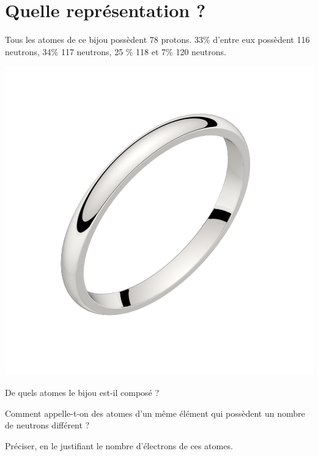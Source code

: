 \section{Quelle représentation ?}

\begin{multicols}{2}
	Tous les atomes de ce bijou possèdent 78 protons. 33\% d'entre eux possèdent 116 neutrons, 34\% 117 neutrons, 25 \% 118 et 7\% 120 neutrons.

	
	\begin{center}
		\includegraphics[scale=0.12]{img/ring2}
	\end{center}
\end{multicols}


\begin{questions}
	\question De quels atomes le bijou est-il composé ?
	\fillwithdottedlines{1.5cm}
	
	\question Comment appelle-t-on des atomes d'un même élément qui possèdent un nombre de neutrons différent ?
	\fillwithdottedlines{1.5cm}
	
	\question Préciser, en le justifiant le nombre d'électrons de ces atomes.
	\fillwithdottedlines{2cm}
\end{questions}
